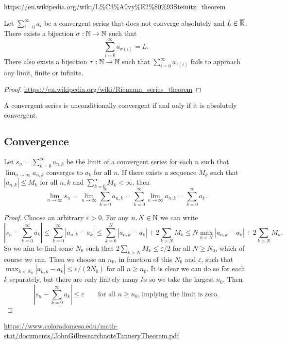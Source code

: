 \begin{proposition}
\url{https://en.wikipedia.org/wiki/L%C3%A9vy%E2%80%93Steinitz_theorem}
\end{proposition}
\begin{corollary}
Let $\sum_{i=0}^\infty a_i$ be a convergent series that does not converge absolutely and $L\in \overline{\mathbb{R}}$. There exists a bijection $\sigma:\mathbb{N}\to\mathbb{N}$ such that
\[ \sum_{i=0}^\infty a_{\sigma(i)} = L. \]
There also exists a bijection $\tau:\mathbb{N}\to\mathbb{N}$ such that $\sum_{i=0}^\infty a_{\tau(i)}$ fails to approach any limit, finite or infinite.
\end{corollary}
\begin{proof}
\url{https://en.wikipedia.org/wiki/Riemann_series_theorem}
\end{proof}
\begin{corollary}
A convergent series is unconditionally convergent \textup{if and only if} it is absolutely convergent.
\end{corollary}



\subsection{Convergence}
\begin{theorem} \label{tannery}
Let $s_n = \sum_{k=0}^\infty a_{n,k}$ be the limit of a convergent series for each $n$ such that $\lim_{n\to \infty}a_{n,k}$ converges to $a_k$ for all $n$. If there exists a sequence $M_k$ such that $|a_{n,k}|\leq M_k$ for all $n,k$ and $\sum_{k=0}^\infty M_k<\infty$, then
\[ \lim_{n\to\infty} s_n = \lim_{n\to\infty}\sum_{k=0}^\infty a_{n,k} = \sum_{k=0}^\infty\lim_{n\to\infty} a_{n,k} = \sum_{k=0}^\infty a_k.   \]
\end{theorem}
\begin{proof}
Choose an arbitrary $\varepsilon>0$. For any $n,N\in\mathbb{N}$ we can write
\[ \left|s_n - \sum_{k=0}^\infty a_k\right| \leq \sum_{k=0}^\infty\left|a_{n,k} -  a_k\right|\leq \sum_{k=0}^N\left|a_{n,k} -  a_k\right| + 2\sum_{k>N}M_k \leq N\max_{k<N}\left|a_{n,k} -  a_k\right| + 2\sum_{k>N}M_k. \]
So we aim to find some $N_0$ such that $2\sum_{k>N}M_k \leq \varepsilon/2$ for all $N\geq N_0$, which of course we can. Then we choose an $n_0$, in function of this $N_0$ and $\varepsilon$, such that $\max_{k<N_0}\left|a_{n,k} -  a_k\right|\leq \varepsilon/(2N_0)$ for all $n\geq n_0$. It is clear we can do so for each $k$ separately, but there are only finitely many $k$s so we take the largest $n_0$. Then
\[ \left|s_n - \sum_{k=0}^\infty a_k\right| \leq \varepsilon \qquad \text{for all $n\geq n_0$, implying the limit is zero.} \]
\end{proof}
\url{https://www.coloradomesa.edu/math-stat/documents/JohnGillresearchnoteTanneryTheorem.pdf}




